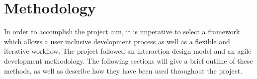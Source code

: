 \chapter{Methodology}
In order to accomplish the project aim, it is imperative to select a framework which allows a user inclusive development process as well as a flexible and iterative workflow. The project followed an interaction design model and an agile development methodology. The following sections will give a brief outline of these methods, as well as describe how they have been used throughout the project.



\iffalse\fi
